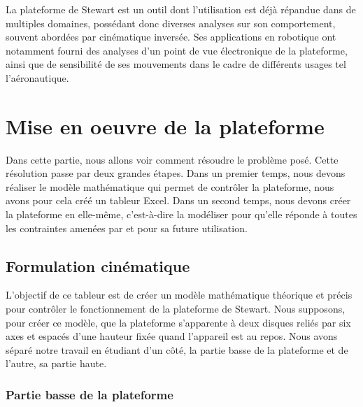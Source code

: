 \documentclass[a4paper,12pt]{article}
\begin{document}
La plateforme de Stewart est un outil dont l'utilisation est déjà répandue dans de multiples domaines, possédant donc diverses analyses sur son comportement, souvent abordées par cinématique inversée. 
Ses applications en robotique ont notamment fourni des analyses d'un point de vue électronique de la plateforme, ainsi que de sensibilité de ses mouvements dans le cadre de différents usages tel l'aéronautique.

\newpage

\section{Mise en oeuvre de la plateforme}

Dans cette partie, nous allons voir comment résoudre le problème posé. 
Cette résolution passe par deux grandes étapes.
Dans un premier temps, nous devons réaliser le modèle mathématique qui permet de contrôler la plateforme, nous avons pour cela créé un tableur Excel. Dans un second temps, nous devons créer la plateforme en elle-même, c'est-à-dire la modéliser pour qu'elle réponde à toutes les contraintes amenées par et pour sa future utilisation.

\subsection{Formulation cinématique}
	
L’objectif de ce tableur est de créer un modèle mathématique théorique et précis pour contrôler le fonctionnement de la plateforme de Stewart. 
Nous supposons, pour créer ce modèle, que la plateforme s’apparente à deux disques reliés par six axes et espacés d’une hauteur fixée quand l’appareil est au repos. 
Nous avons séparé notre travail en étudiant d’un côté, la partie basse de la plateforme et de l’autre, sa partie haute.

\subsubsection{Partie basse de la plateforme}
\end{document}
